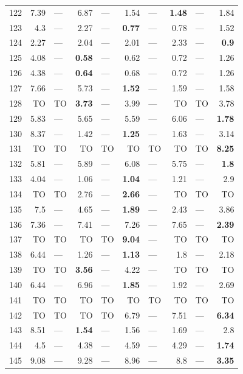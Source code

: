 \begin{longtable}{lr@{\hskip 4pt}l@{\hskip 12pt}r@{\hskip 4pt}l@{\hskip 12pt}r@{\hskip 4pt}l@{\hskip 12pt}r@{\hskip 4pt}l@{\hskip 12pt}r}
\midrule
122 & 7.39 & --- & 6.87 & --- & 1.54 & --- & \textbf{1.48} & --- & 1.84 \\
123 & 4.3 & --- & 2.27 & --- & \textbf{0.77} & --- & 0.78 & --- & 1.52 \\
124 & 2.27 & --- & 2.04 & --- & 2.01 & --- & 2.33 & --- & \textbf{0.9} \\
125 & 4.08 & --- & \textbf{0.58} & --- & 0.62 & --- & 0.72 & --- & 1.26 \\
126 & 4.38 & --- & \textbf{0.64} & --- & 0.68 & --- & 0.72 & --- & 1.26 \\
127 & 7.66 & --- & 5.73 & --- & \textbf{1.52} & --- & 1.59 & --- & 1.58 \\
128 & TO & TO & \textbf{3.73} & --- & 3.99 & --- & TO & TO & 3.78 \\
129 & 5.83 & --- & 5.65 & --- & 5.59 & --- & 6.06 & --- & \textbf{1.78} \\
130 & 8.37 & --- & 1.42 & --- & \textbf{1.25} & --- & 1.63 & --- & 3.14 \\
131 & TO & TO & TO & TO & TO & TO & TO & TO & \textbf{8.25} \\
132 & 5.81 & --- & 5.89 & --- & 6.08 & --- & 5.75 & --- & \textbf{1.8} \\
133 & 4.04 & --- & 1.06 & --- & \textbf{1.04} & --- & 1.21 & --- & 2.9 \\
134 & TO & TO & 2.76 & --- & \textbf{2.66} & --- & TO & TO & TO \\
135 & 7.5 & --- & 4.65 & --- & \textbf{1.89} & --- & 2.43 & --- & 3.86 \\
136 & 7.36 & --- & 7.41 & --- & 7.26 & --- & 7.65 & --- & \textbf{2.39} \\
137 & TO & TO & TO & TO & \textbf{9.04} & --- & TO & TO & TO \\
138 & 6.44 & --- & 1.26 & --- & \textbf{1.13} & --- & 1.8 & --- & 2.18 \\
139 & TO & TO & \textbf{3.56} & --- & 4.22 & --- & TO & TO & TO \\
140 & 6.44 & --- & 6.96 & --- & \textbf{1.85} & --- & 1.92 & --- & 2.69 \\
141 & TO & TO & TO & TO & TO & TO & TO & TO & TO \\
142 & TO & TO & TO & TO & 6.79 & --- & 7.51 & --- & \textbf{6.34} \\
143 & 8.51 & --- & \textbf{1.54} & --- & 1.56 & --- & 1.69 & --- & 2.8 \\
144 & 4.5 & --- & 4.38 & --- & 4.59 & --- & 4.29 & --- & \textbf{1.74} \\
145 & 9.08 & --- & 9.28 & --- & 8.96 & --- & 8.8 & --- & \textbf{3.35} \\

\end{longtable}

